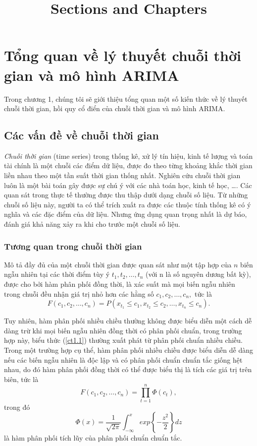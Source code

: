 \documentclass[12pt, a4paper,oneside]{book}
\title{Sections and Chapters}
\theoremstyle{definition}
\begin{document}
\tableofcontents



\listoffigures
\listoftables
\chapter{Tổng quan về lý thuyết chuỗi thời gian và mô hình ARIMA}

Trong chương 1, chúng tôi sẽ giới thiệu tổng quan một số kiến thức về lý thuyết chuỗi thời gian, hồi quy cổ điển của chuỗi thời gian và mô hình ARIMA.

\section{Các vấn đề về chuỗi thời gian}

\textit{Chuỗi thời gian} (time series) trong thống kê, xử lý tín hiệu, kinh tế lượng và toán tài chính là một chuỗi các điểm dữ liệu, được đo theo từng khoảng khắc thời gian liền nhau theo một tần suất thời gian thống nhất. Nghiên cứu chuỗi thời gian luôn là một bài toán gây được sự chú ý với các nhà toán học, kinh tế học, \dots. Các quan sát trong thực tế thường được thu thập dưới dạng chuỗi số liệu. Từ những chuỗi số liệu này, người ta có thể trích xuất ra được các thuộc tính thống kê có ý nghĩa và các đặc điểm của dữ liệu. Nhưng ứng dụng quan trọng nhất là dự báo, đánh giá khả năng xảy ra khi cho trước một chuỗi số liệu.
\subsection{Tương quan trong chuỗi thời gian}

Mô tả đầy đủ của một chuỗi thời gian được quan sát như một tập hợp của $n$ biến ngẫu nhiên tại các thời điểm tùy ý $t_{1}, t_{2}, \dots, t_{n}$ (với n là số nguyên dương bất kỳ), được cho bởi hàm phân phối đồng thời, là xác suất mà mọi biến ngẫu nhiên trong chuỗi đều nhận giá trị nhỏ hơn các hằng số $c_{1}, c_{2}, \dots, c_{n},$ tức là
\begin{equation}
F(c_{1}, c_{2}, \dots, c_{n})= P(x_{t_{1}}\leq c_{1}, x_{t_{2}}\leq c_{2}, \dots, x_{t_{n}}\leq c_{n}). \label{ct1.1}
\end{equation}

Tuy nhiên, hàm phân phối nhiều chiều thường không được biểu diễn một cách dễ dàng trừ khi mọi biến ngẫu nhiên đồng thời có phân phối chuẩn, trong trường hợp này, biểu thức (\ref{ct1.1}) thường xuất phát từ phân phối chuẩn nhiều chiều. Trong một trường hợp cụ thể, hàm phân phối nhiều chiều được biểu diễn dễ dàng nếu các biến ngẫu nhiên là độc lập và có phân phối chuẩn chuẩn tắc giống hệt nhau, do đó hàm phân phối đồng thời có thể được biểu thị là tích các giá trị trên biên, tức là
\begin{equation}
F(c_{1}, c_{2}, \dots, c_{n})=  \prod_{t=1}^{n}\Phi(c_{t}), \label{ct1.2}
\end{equation}
trong đó
\begin{equation}
\Phi(x) = \dfrac{1}{\sqrt{2\pi}} \int_{-\infty}^{x} exp \left\lbrace -\dfrac{z^2}{2}\right\rbrace  dz \label{ct1.3}
\end{equation}
là hàm phân phối tích lũy của phân phối chuẩn chuẩn tắc.
\end{document}
